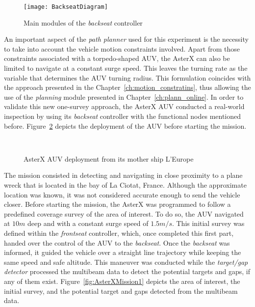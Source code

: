 \begin{figure}[htbp] %
\centering
	\texttt{[image: BackseatDiagram]}
\caption[Main modules of the \textit{backseat} controller.]
{Main modules of the \textit{backseat} controller}
\label{fig:BackseatDiagram}
\end{figure}

An important aspect of the \textit{path planner} used for this experiment is
the necessity to take into account the vehicle motion constraints involved.
Apart from those constraints associated with a torpedo-shaped \ac{AUV}, the
AsterX can also be limited to navigate at a constant surge speed. This leaves the
turning rate as the variable that determines the \ac{AUV} turning radius.
This formulation coincides with the approach presented in the
Chapter~\ref{ch:motion_constratins}, thus allowing the use of the
\textit{planning} module presented in Chapter~\ref{ch:plann_online}. In order to
validate this new one-survey approach, the AsterX \ac{AUV} conducted a
real-world inspection by using its \textit{backseat} controller with the
functional nodes mentioned before. Figure~\ref{fig:AsterXDeployment} depicts
the deployment of the \ac{AUV} before starting the mission.

\begin{figure}[htbp]
\myfloatalign
	\quad
   	\\
\caption[AsterX AUV deployment from its mother ship.]
{AsterX AUV deployment from its mother ship L'Europe}
\label{fig:AsterXDeployment}
\end{figure}

The mission consisted in detecting and navigating in close proximity to a plane
wreck that is located in the bay of La Ciotat, France. Although the approximate
location was known, it was not considered accurate enough to send the vehicle
closer. Before starting the mission, the AsterX was programmed to follow a
predefined coverage survey of the area of interest. To do so, the \ac{AUV}
navigated at $10m$ deep and with a constant surge speed of $1.5m/s$.
This initial survey was defined within the \textit{frontseat} controller, which,
once completed this first part, handed over the control of the \ac{AUV} to the
\textit{backseat}. Once the \textit{backseat} was informed, it guided the
vehicle over a straight line trajectory while keeping the same speed and safe
altitude. This maneuver was conducted while the \textit{target/gap detector}
processed the multibeam data to detect the potential targets and gaps, if any of
them exist. Figure~\ref{fig:AsterXMission1} depicts the area of interest, the
initial survey, and the potential target and gaps detected from the multibeam
data.


